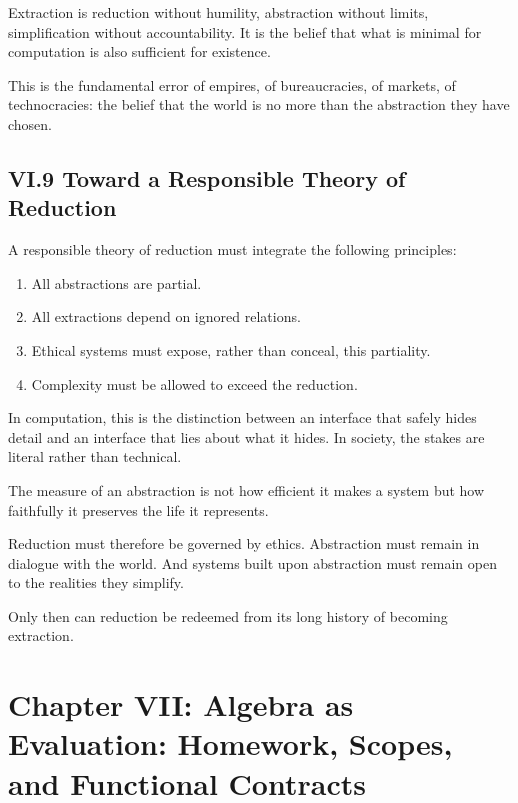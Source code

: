 \documentclass[11pt,letterpaper]{article}
\begin{document}
Extraction is reduction without humility, abstraction without limits, simplification without accountability. It is the belief that what is minimal for computation is also sufficient for existence.

This is the fundamental error of empires, of bureaucracies, of markets, of technocracies: the belief that the world is no more than the abstraction they have chosen.

\subsection{VI.9 Toward a Responsible Theory of Reduction}

A responsible theory of reduction must integrate the following principles:

\begin{enumerate}
    \item All abstractions are partial.
    \item All extractions depend on ignored relations.
    \item Ethical systems must expose, rather than conceal, this partiality.
    \item Complexity must be allowed to exceed the reduction.
\end{enumerate}

In computation, this is the distinction between an interface that safely hides detail and an interface that lies about what it hides. In society, the stakes are literal rather than technical.

The measure of an abstraction is not how efficient it makes a system but how faithfully it preserves the life it represents.

Reduction must therefore be governed by ethics. Abstraction must remain in dialogue with the world. And systems built upon abstraction must remain open to the realities they simplify.

Only then can reduction be redeemed from its long history of becoming extraction.

\newpage
\section{Chapter VII: Algebra as Evaluation: Homework, Scopes, and Functional Contracts}
\end{document}
